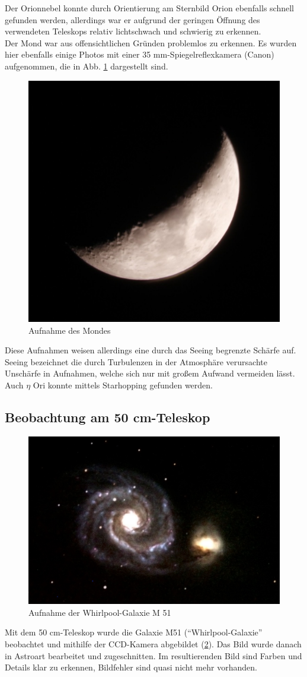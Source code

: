 Der Orionnebel konnte durch Orientierung am Sternbild Orion ebenfalls schnell gefunden werden, allerdings war er aufgrund der geringen Öffnung des verwendeten Teleskops relativ lichtschwach und schwierig zu erkennen. \\
Der Mond war aus offensichtlichen Gründen problemlos zu erkennen. Es wurden hier ebenfalls einige Photos mit einer 35 mm-Spiegelreflexkamera (Canon) aufgenommen, die in Abb. \ref{fig:mond} dargestellt sind. 
\begin{figure}[h!]
\centering
        \includegraphics[width=.4\textwidth]{mond.JPG}
\caption{Aufnahme des Mondes }
\label{fig:mond}
\end{figure}
Diese Aufnahmen weisen allerdings eine durch das Seeing begrenzte Schärfe auf. Seeing bezeichnet die durch Turbulenzen in der Atmosphäre verursachte Unschärfe in Aufnahmen, welche sich nur mit großem Aufwand vermeiden lässt. \\
Auch $\eta$ Ori konnte mittels Starhopping gefunden werden.

\subsection{Beobachtung am 50 cm-Teleskop} 
\begin{figure}[h!]
\centering
        \includegraphics[width=.8\textwidth]{whirlpool.jpg}
\caption{ Aufnahme der Whirlpool-Galaxie M 51 }
\label{fig:whirl}
\end{figure}
Mit dem 50 cm-Teleskop wurde die Galaxie M51 (\enquote{Whirlpool-Galaxie} beobachtet und mithilfe der CCD-Kamera abgebildet (\ref{fig:whirl}). Das Bild wurde danach in Astroart bearbeitet und zugeschnitten. Im resultierenden Bild sind Farben und Details klar zu erkennen, Bildfehler sind quasi nicht mehr vorhanden.
